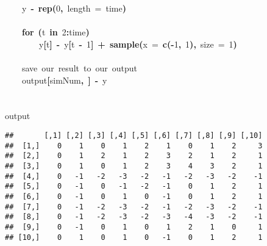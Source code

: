 \documentclass{article}\usepackage{graphicx, color}
\makeatletter
\newcommand{\hlnumber}[1]{\textcolor[rgb]{0,0,0}{#1}}%
\newcommand{\hlfunctioncall}[1]{\textcolor[rgb]{0.501960784313725,0,0.329411764705882}{\textbf{#1}}}%
\newcommand{\hlkeyword}[1]{\textcolor[rgb]{0,0,0}{\textbf{#1}}}%
\newcommand{\hlargument}[1]{\textcolor[rgb]{0.690196078431373,0.250980392156863,0.0196078431372549}{#1}}%
\newcommand{\hlcomment}[1]{\textcolor[rgb]{0.180392156862745,0.6,0.341176470588235}{#1}}%
\newcommand{\hlassignement}[1]{\textcolor[rgb]{0,0,0}{\textbf{#1}}}%
\newcommand{\hlsymbol}[1]{\textcolor[rgb]{0,0,0}{#1}}%
\newcommand{\hlstd}[1]{\textcolor[rgb]{0,0,0}{#1}}%
\newenvironment{kframe}{%
 \def\FrameCommand##1{\hskip\@totalleftmargin \hskip-\fboxsep
 \colorbox{shadecolor}{##1}\hskip-\fboxsep
     \hskip-\linewidth \hskip-\@totalleftmargin \hskip\columnwidth}%
 \MakeFramed {\advance\hsize-\width
   \@totalleftmargin\z@ \linewidth\hsize
   \@setminipage}}%
 {\par\unskip\endMakeFramed}
\newenvironment{knitrout}{}{} %
\makeatother
\begin{document}
\begin{knitrout}
\begin{kframe}
\begin{flushleft}
\hlstd{}{\ }{\ }{\ }{\ }\hlsymbol{y}{\ }\hlassignement{\usebox{\hlnormalsizeboxlessthan}-}{\ }\hlfunctioncall{rep}\hlkeyword{(}\hlnumber{0}\hlkeyword{,}{\ }\hlargument{length}{\ }\hlargument{=}{\ }\hlsymbol{time}\hlkeyword{)}\hspace*{\fill}\\
\hlstd{}\hspace*{\fill}\\
\hlstd{}{\ }{\ }{\ }{\ }\hlkeyword{for}{\ }\hlkeyword{(}\hlsymbol{t}{\ }\hlkeyword{in}{\ }\hlnumber{2}\hlkeyword{:}\hlsymbol{time}\hlkeyword{)}{\ }\hlkeyword{\usebox{\hlnormalsizeboxopenbrace}}\hspace*{\fill}\\
\hlstd{}{\ }{\ }{\ }{\ }{\ }{\ }{\ }{\ }\hlsymbol{y}\hlkeyword{[}\hlsymbol{t}\hlkeyword{]}{\ }\hlassignement{\usebox{\hlnormalsizeboxlessthan}-}{\ }\hlsymbol{y}\hlkeyword{[}\hlsymbol{t}{\ }\hlkeyword{-}{\ }\hlnumber{1}\hlkeyword{]}{\ }\hlkeyword{+}{\ }\hlfunctioncall{sample}\hlkeyword{(}\hlargument{x}{\ }\hlargument{=}{\ }\hlfunctioncall{c}\hlkeyword{(}\hlkeyword{-}\hlnumber{1}\hlkeyword{,}{\ }\hlnumber{1}\hlkeyword{)}\hlkeyword{,}{\ }\hlargument{size}{\ }\hlargument{=}{\ }\hlnumber{1}\hlkeyword{)}\hspace*{\fill}\\
\hlstd{}{\ }{\ }{\ }{\ }\hlkeyword{\usebox{\hlnormalsizeboxclosebrace}}\hspace*{\fill}\\
\hlstd{}{\ }{\ }{\ }{\ }\hlcomment{\usebox{\hlnormalsizeboxhash}{\ }save{\ }our{\ }result{\ }to{\ }our{\ }output}\hspace*{\fill}\\
\hlstd{}{\ }{\ }{\ }{\ }\hlsymbol{output}\hlkeyword{[}\hlsymbol{simNum}\hlkeyword{,}{\ }\hlkeyword{]}{\ }\hlassignement{\usebox{\hlnormalsizeboxlessthan}-}{\ }\hlsymbol{y}\hspace*{\fill}\\
\hlstd{}\hlkeyword{\usebox{\hlnormalsizeboxclosebrace}}\hspace*{\fill}\\
\hlstd{}\hspace*{\fill}\\
\hlstd{}\hlsymbol{output}\mbox{}
\normalfont
\end{flushleft}
\begin{verbatim}
##       [,1] [,2] [,3] [,4] [,5] [,6] [,7] [,8] [,9] [,10]
##  [1,]    0    1    0    1    2    1    0    1    2     3
##  [2,]    0    1    2    1    2    3    2    1    2     1
##  [3,]    0    1    0    1    2    3    4    3    2     1
##  [4,]    0   -1   -2   -3   -2   -1   -2   -3   -2    -1
##  [5,]    0   -1    0   -1   -2   -1    0    1    2     1
##  [6,]    0   -1    0    1    0   -1    0    1    2     1
##  [7,]    0   -1   -2   -3   -2   -1   -2   -3   -2    -1
##  [8,]    0   -1   -2   -3   -2   -3   -4   -3   -2    -1
##  [9,]    0   -1    0    1    0    1    2    1    0     1
## [10,]    0    1    0    1    0   -1    0    1    2     1
\end{verbatim}
\end{kframe}
\end{knitrout}
\end{document}
